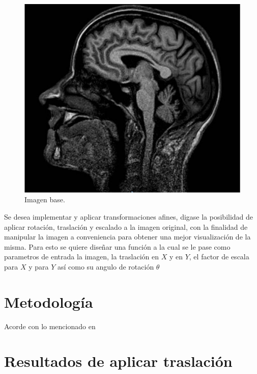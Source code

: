 \documentclass[11pt, letterpaper]{article}
\begin{document}
\begin{figure}[h!]
	\centering
	\begin{minipage}{0.8\textwidth}
		\centering
		\includegraphics[width=\textwidth]{IMG/F1.jpg}
		\caption{Imagen base.}
		\label{fig:f1}
	\end{minipage}\hfill
\end{figure}

Se desea implementar y aplicar transformaciones afines, digase la posibilidad de aplicar rotación, traslación y escalado a la imagen original, con la finalidad de manipular la imagen a conveniencia para obtener una mejor visualización de la misma. Para esto se quiere diseñar una función a la cual se le pase como parametros de entrada la imagen, la traslación en $X$ y en $Y$, el factor de escala para $X$ y para $Y$ así como su angulo de rotación $\theta$




	
\newpage
	
\section{Metodología}
	
Acorde con lo mencionado en \cite{gonzalez2018digital}

\newpage

\section{Resultados de aplicar traslación}
\end{document}
